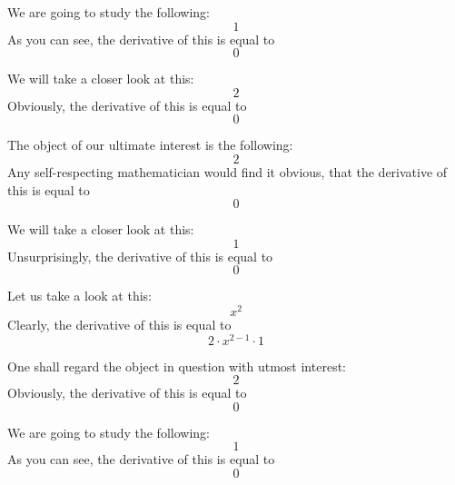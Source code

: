 \documentclass{article}
\begin{document}
We are going to study the following:
\begin{equation}
1 
\end{equation}
As you can see, the derivative of this is equal to
\begin{equation}
0 
\end{equation}

We will take a closer look at this:
\begin{equation}
2 
\end{equation}
Obviously, the derivative of this is equal to
\begin{equation}
0 
\end{equation}

The object of our ultimate interest is the following:
\begin{equation}
2 
\end{equation}
Any self-respecting mathematician would find it obvious, that the derivative of this is equal to
\begin{equation}
0 
\end{equation}

We will take a closer look at this:
\begin{equation}
1 
\end{equation}
Unsurprisingly, the derivative of this is equal to
\begin{equation}
0 
\end{equation}

Let us take a look at this:
\begin{equation}
x ^{2 } 
\end{equation}
Clearly, the derivative of this is equal to
\begin{equation}
2 \cdot x ^{2 - 1 } \cdot 1 
\end{equation}

One shall regard the object in question with utmost interest:
\begin{equation}
2 
\end{equation}
Obviously, the derivative of this is equal to
\begin{equation}
0 
\end{equation}

We are going to study the following:
\begin{equation}
1 
\end{equation}
As you can see, the derivative of this is equal to
\begin{equation}
0 
\end{equation}
\end{document}
